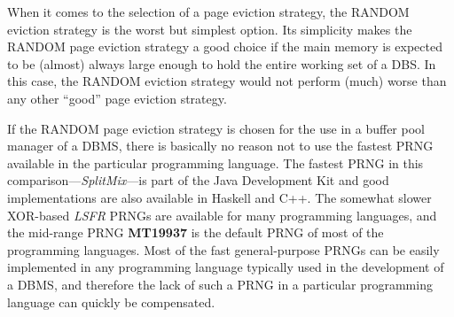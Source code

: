     When it comes to the selection of a page eviction strategy, the RANDOM eviction strategy is the worst but simplest option. Its simplicity makes the RANDOM page eviction strategy a good choice if the main memory is expected to be (almost) always large enough to hold the entire working set of a DBS. In this case, the RANDOM eviction strategy would not perform (much) worse than any other ``good'' page eviction strategy.

    If the RANDOM page eviction strategy is chosen for the use in a buffer pool manager of a DBMS, there is basically no reason not to use the fastest PRNG available in the particular programming language. The fastest PRNG in this comparison---\emph{SplitMix}---is part of the Java Development Kit and good implementations are also available in Haskell and C++. The somewhat slower XOR-based \emph{LSFR} PRNGs are available for many programming languages, and the mid-range PRNG \textbf{MT19937} is the default PRNG of most of the programming languages. Most of the fast general-purpose PRNGs can be easily implemented in any programming language typically used in the development of a DBMS, and therefore the lack of such a PRNG in a particular programming language can quickly be compensated.
